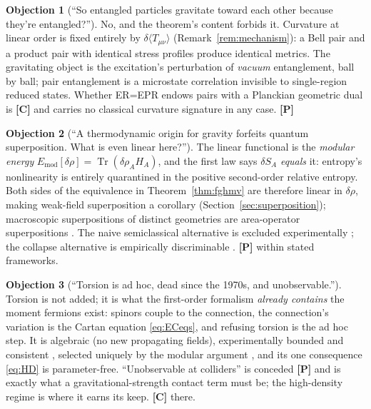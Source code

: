 \documentclass[11pt]{article}
\theoremstyle{definition}
\newtheorem{objection}{Objection}[section]
\newcommand{\pP}{\textbf{[P]}}
\newcommand{\pC}{\textbf{[C]}}
\newcommand{\Tr}{\operatorname{Tr}}
\begin{document}
\begin{objection}[``So entangled particles gravitate toward each other
because they're entangled?'']
No, and the theorem's content forbids it. Curvature at linear order is
fixed entirely by $\delta\langle T_{\mu\nu}\rangle$
(Remark~\ref{rem:mechanism}): a Bell pair and a product pair with
identical stress profiles produce identical metrics. The gravitating
object is the excitation's perturbation of \emph{vacuum} entanglement,
ball by ball; pair entanglement is a microstate correlation invisible to
single-region reduced states. Whether ER=EPR
\cite{MaldacenaSusskind2013} endows pairs with a Planckian geometric dual
is \pC{} and carries no classical curvature signature in any case. \pP{}
\end{objection}

\begin{objection}[``A thermodynamic origin for gravity forfeits quantum
superposition. What is even linear here?'']
The linear functional is the \emph{modular energy}
$E_{\mathrm{mod}}[\delta\rho]=\Tr(\delta\rho_A H_A)$, and the first law
says $\delta S_A$ \emph{equals} it: entropy's nonlinearity is entirely
quarantined in the positive second-order relative entropy. Both sides of
the equivalence in Theorem~\ref{thm:fghmv} are therefore linear in
$\delta\rho$, making weak-field superposition a corollary
(Section~\ref{sec:superposition}); macroscopic superpositions of distinct
geometries are area-operator superpositions \cite{Harlow2017}. The naive
semiclassical alternative is excluded experimentally
\cite{PageGeilker1981}; the collapse alternative \cite{Penrose1996} is
empirically discriminable \cite{Bose2017,MarlettoVedral2017}. \pP{}
within stated frameworks.
\end{objection}

\begin{objection}[``Torsion is ad hoc, dead since the 1970s, and
unobservable.'']
Torsion is not added; it is what the first-order formalism \emph{already
contains} the moment fermions exist: spinors couple to the connection, the
connection's variation is the Cartan equation \eqref{eq:ECeqs}, and
refusing torsion is the ad hoc step. It is algebraic (no new propagating
fields), experimentally bounded and consistent \cite{KRT2008,Shapiro2002},
selected uniquely by the modular argument \cite{McGwier2026b}, and its one
consequence \eqref{eq:HD} is parameter-free. ``Unobservable at colliders''
is conceded \pP{} and is exactly what a gravitational-strength contact
term must be; the high-density regime \cite{Trautman1973,Poplawski2010}
is where it earns its keep. \pC{} there.
\end{objection}
\end{document}
